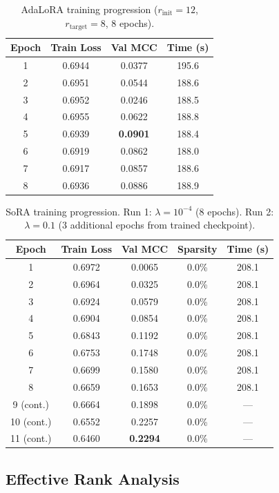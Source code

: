 \documentclass[12pt,a4paper]{article}
\theoremstyle{definition}
\begin{document}
\begin{table}[H]
\centering
\caption{AdaLoRA training progression ($r_{\text{init}}=12$, $r_{\text{target}}=8$, 8 epochs).}
\label{tab:adalora_curve}
\begin{tabular}{cccc}
\toprule
Epoch & Train Loss & Val MCC & Time (s) \\
\midrule
1 & 0.6944 & 0.0377 & 195.6 \\
2 & 0.6951 & 0.0544 & 188.6 \\
3 & 0.6952 & 0.0246 & 188.5 \\
4 & 0.6955 & 0.0622 & 188.8 \\
5 & 0.6939 & \textbf{0.0901} & 188.4 \\
6 & 0.6919 & 0.0862 & 188.0 \\
7 & 0.6917 & 0.0857 & 188.6 \\
8 & 0.6936 & 0.0886 & 188.9 \\
\bottomrule
\end{tabular}
\end{table}

\begin{table}[H]
\centering
\caption{SoRA training progression. Run 1: $\lambda=10^{-4}$ (8 epochs). Run 2: $\lambda=0.1$ (3 additional epochs from trained checkpoint).}
\label{tab:sora_curve}
\begin{tabular}{ccccc}
\toprule
Epoch & Train Loss & Val MCC & Sparsity & Time (s) \\
\midrule
1  & 0.6972 & 0.0065 & 0.0\% & 208.1 \\
2  & 0.6964 & 0.0325 & 0.0\% & 208.1 \\
3  & 0.6924 & 0.0579 & 0.0\% & 208.1 \\
4  & 0.6904 & 0.0854 & 0.0\% & 208.1 \\
5  & 0.6843 & 0.1192 & 0.0\% & 208.1 \\
6  & 0.6753 & 0.1748 & 0.0\% & 208.1 \\
7  & 0.6699 & 0.1580 & 0.0\% & 208.1 \\
8  & 0.6659 & 0.1653 & 0.0\% & 208.1 \\
\midrule
9  (cont.) & 0.6664 & 0.1898 & 0.0\% & --- \\
10 (cont.) & 0.6552 & 0.2257 & 0.0\% & --- \\
11 (cont.) & 0.6460 & \textbf{0.2294} & 0.0\% & --- \\
\bottomrule
\end{tabular}
\end{table}

\subsection{Effective Rank Analysis}
\end{document}
